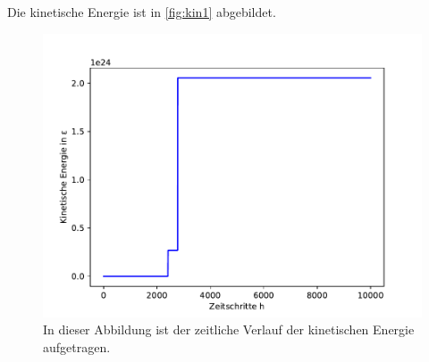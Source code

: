 Die kinetische Energie ist in \autoref{fig:kin1} abgebildet.
\begin{figure}[H]
    \centering
    \includegraphics[scale=0.5]{MolDyn/Medium Boy/kinetic_energy.pdf}
    \caption{In dieser Abbildung ist der zeitliche Verlauf der kinetischen Energie aufgetragen.}
    \label{fig:kin1}
\end{figure}
\newpage
